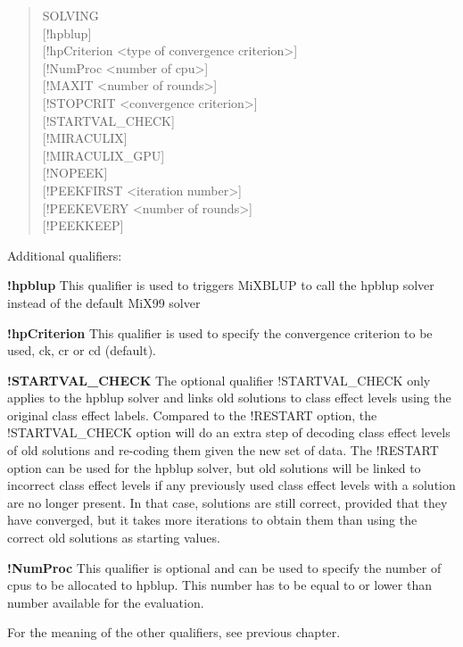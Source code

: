 \begin{quote}
SOLVING\\
{[}!hpblup{]}\\
{[}!hpCriterion \textless type of convergence criterion\textgreater{]}\\
{[}!NumProc \textless number of cpu\textgreater{]}\\
{[}!MAXIT \textless number of rounds\textgreater{]}\\
{[}!STOPCRIT \textless convergence criterion\textgreater{]}\\
{[}!STARTVAL\_CHECK{]}\\
{[}!MIRACULIX{]}\\
{[}!MIRACULIX\_GPU{]}\\
{[}!NOPEEK{]}\\
{[}!PEEKFIRST \textless iteration number\textgreater{]}\\
{[}!PEEKEVERY \textless number of rounds\textgreater{]}\\
{[}!PEEKKEEP{]}
\end{quote}

Additional qualifiers:

\textbf{!hpblup} This qualifier is used to triggers MiXBLUP to call the
hpblup solver instead of the default MiX99 solver

\textbf{!hpCriterion} This qualifier is used to specify the convergence
criterion to be used, ck, cr or cd (default).

\textbf{!STARTVAL\_CHECK} The optional qualifier !STARTVAL\_CHECK only
applies to the hpblup solver and links old solutions to class effect
levels using the original class effect labels. Compared to the !RESTART
option, the !STARTVAL\_CHECK option will do an extra step of decoding
class effect levels of old solutions and re-coding them given the new
set of data. The !RESTART option can be used for the hpblup solver, but
old solutions will be linked to incorrect class effect levels if any
previously used class effect levels with a solution are no longer
present. In that case, solutions are still correct, provided that they
have converged, but it takes more iterations to obtain them than using
the correct old solutions as starting values.

\textbf{!NumProc } This qualifier is optional and can be used to specify
the number of cpus to be allocated to hpblup. This number has to be
equal to or lower than number available for the evaluation.

For the meaning of the other qualifiers, see previous chapter.

